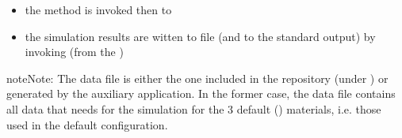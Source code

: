 \documentclass[letterpaper,10pt,english]{sphinxmanual}
\begin{document}
\begin{itemize}
\item {} 
\sphinxAtStartPar
the  method is invoked then to 

\item {} 
\sphinxAtStartPar
the simulation results are witten to file (and to the standard output) by invoking  (from the )

\end{itemize}


\sphinxAtStartPar

\begin{sphinxadmonition}{note}{Note:}
\sphinxAtStartPar
The  data file is either the one included in the  repository (under ) or generated by the auxiliary  application. In the former case, the data file contains all data that  needs for the simulation for the 3 default () materials, i.e. those used in the default  configuration. 
\end{sphinxadmonition}
\end{document}
